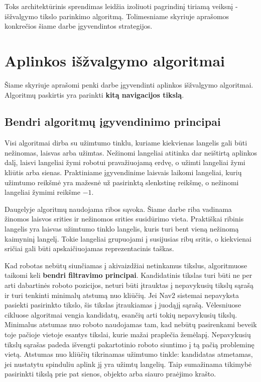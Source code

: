 \documentclass[]{VUMIFTemplateClass}
\begin{document}
Toks architektūrinis sprendimas leidžia izoliuoti pagrindinį tiriamą veiksnį - išžvalgymo tikslo parinkimo algoritmą. Tolimesniame skyriuje aprašomos
konkrečios šiame darbe įgyvendintos strategijos.


\section[APLINKOS IŠŽVALGYMO ALGORITMAI]{Aplinkos išžvalgymo algoritmai}

Šiame skyriuje aprašomi penki darbe įgyvendinti aplinkos išžvalgymo algoritmai. Algoritmų paskirtis yra parinkti \textbf{kitą
navigacijos tikslą}.

\subsection{Bendri algoritmų įgyvendinimo principai}

Visi algoritmai dirba su užimtumo tinklu, kuriame kiekvienas langelis gali būti nežinomas, laisvas arba užimtas. Nežinomi langeliai atitinka dar neištirtą
aplinkos dalį, laisvi langeliai žymi robotui pravažiuojamą erdvę, o užimti langeliai žymi kliūtis arba sienas. Praktiniame įgyvendinime laisvais laikomi
langeliai, kurių užimtumo reikšmė yra mažesnė už pasirinktą slenkstinę reikšmę, o nežinomi langeliai žymimi reikšme $-1$.

Daugelyje algoritmų naudojama ribos sąvoka. Šiame darbe riba vadinama žinomos laisvos srities ir nežinomos srities susidūrimo vieta. Praktiškai ribinis langelis yra
laisvas užimtumo tinklo langelis, kuris turi bent vieną nežinomą kaimyninį langelį. Tokie langeliai grupuojami į susijusias ribų sritis, o kiekvienai sričiai
gali būti apskaičiuojamas reprezentacinis taškas.

Kad robotas nebūtų siunčiamas į akivaizdžiai netinkamus tikslus, algoritmuose taikomi keli \textbf{bendri filtravimo principai}. Kandidatinis tikslas turi būti ne per
arti dabartinės roboto pozicijos, neturi būti įtrauktas į nepavykusių tikslų sąrašą ir turi tenkinti minimalų atstumą nuo kliūčių. Jei Nav2 sistemai nepavyksta
pasiekti pasirinkto tikslo, šis tikslas įtraukiamas į juodąjį sąrašą. Vėlesniuose cikluose algoritmai vengia kandidatų, esančių arti tokių nepavykusių tikslų.
Minimalus atstumas nuo roboto naudojamas tam, kad nebūtų pasirenkami beveik toje pačioje vietoje esantys tikslai, kurie mažai praplečia žemėlapį. Nepavykusių
tikslų sąrašas padeda išvengti pakartotinio roboto siuntimo į tą pačią probleminę vietą. Atstumas nuo kliūčių tikrinamas užimtumo tinkle: kandidatas atmetamas,
jei nustatytu spinduliu aplink jį yra užimtų langelių. Taip sumažinama tikimybė pasirinkti tikslą prie pat sienos, objekto arba siauro praėjimo krašto.
\end{document}
